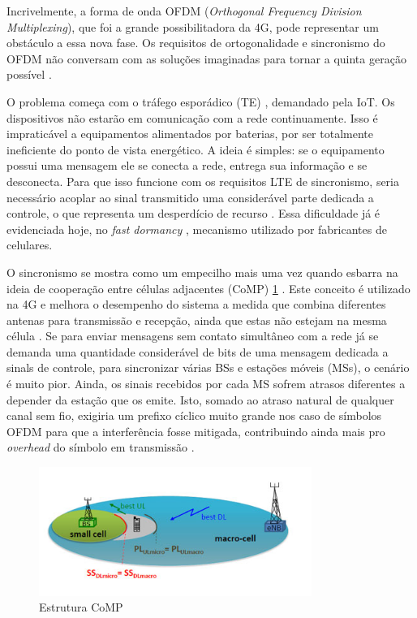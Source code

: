 Incrivelmente, a forma de onda OFDM (\textit{Orthogonal Frequency Division Multiplexing}), que foi a grande possibilitadora da 4G, pode representar um obstáculo a essa nova fase. Os requisitos de ortogonalidade e sincronismo do OFDM não conversam com as soluções imaginadas para tornar a quinta geração possível \cite{Wunder}. 

\par O problema começa com o tráfego esporádico (TE) \cite{Wild}, demandado pela IoT. Os dispositivos não estarão em comunicação com a rede continuamente. Isso é impraticável a equipamentos alimentados por baterias, por ser totalmente ineficiente do ponto de vista energético. A ideia é simples: se o equipamento possui uma mensagem ele se conecta a rede, entrega sua informação e se desconecta. Para que isso funcione com os requisitos LTE de sincronismo, seria necessário acoplar ao sinal transmitido uma considerável parte dedicada a controle, o que representa um desperdício de recurso \cite{Wunder}. Essa dificuldade já é evidenciada hoje, no \textit{fast dormancy} \cite{Zhao}, mecanismo utilizado por fabricantes de celulares.    
\par O sincronismo se mostra como um empecilho mais uma vez quando esbarra na ideia de cooperação entre células adjacentes (CoMP) \ref{comp} \cite{Wunder}. Este conceito é utilizado na 4G e melhora o desempenho do sistema a medida que combina diferentes antenas para transmissão e recepção, ainda que estas não estejam na mesma célula \cite{DLee}. Se para enviar mensagens sem contato simultâneo com a rede já se demanda uma quantidade considerável de bits de uma mensagem dedicada a sinals de controle, para sincronizar várias BSs e estações móveis (MSs), o cenário é muito pior. Ainda, os sinais recebidos por cada MS sofrem atrasos diferentes a depender da estação que os emite. Isto, somado ao atraso natural de qualquer canal sem fio, exigiria um prefixo cíclico muito grande nos caso de símbolos OFDM para que a interferência fosse mitigada, contribuindo ainda mais pro \textit{overhead} do símbolo em transmissão \cite{Wunder}. 
\begin{figure}[h!]
\centering
\includegraphics[width=3.5in]{comp.png}
\caption{Estrutura CoMP}
\label{comp}
\end{figure}
